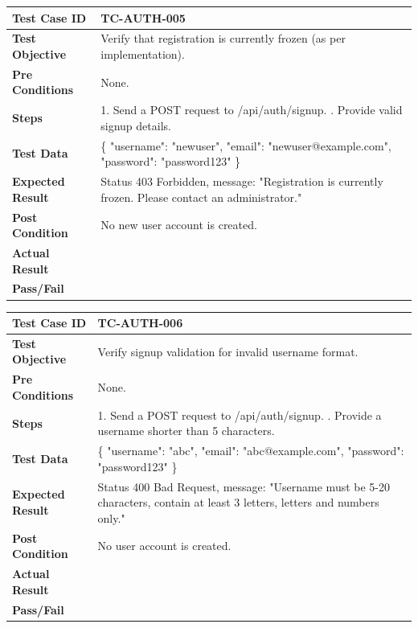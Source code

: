 \begin{longtable}{|p{}|p{}|}
\hline
\textbf{Test Case ID} & TC-AUTH-005 \\ \hline
\textbf{Test Objective} & Verify that registration is currently frozen (as per implementation). \\ \hline
\textbf{Pre Conditions} & None. \\ \hline
\textbf{Steps} & 
1. Send a POST request to /api/auth/signup. \newline
2. Provide valid signup details. \\ \hline
\textbf{Test Data} & \{ "username": "newuser", "email": "newuser@example.com", "password": "password123" \} \\ \hline
\textbf{Expected Result} & Status 403 Forbidden, message: "Registration is currently frozen. Please contact an administrator." \\ \hline
\textbf{Post Condition} & No new user account is created. \\ \hline
\textbf{Actual Result} &  \\ \hline
\textbf{Pass/Fail} &  \\ \hline
\end{longtable}

\begin{longtable}{|p{}|p{}|}
\hline
\textbf{Test Case ID} & TC-AUTH-006 \\ \hline
\textbf{Test Objective} & Verify signup validation for invalid username format. \\ \hline
\textbf{Pre Conditions} & None. \\ \hline
\textbf{Steps} & 
1. Send a POST request to /api/auth/signup. \newline
2. Provide a username shorter than 5 characters. \\ \hline
\textbf{Test Data} & \{ "username": "abc", "email": "abc@example.com", "password": "password123" \} \\ \hline
\textbf{Expected Result} & Status 400 Bad Request, message: "Username must be 5-20 characters, contain at least 3 letters, letters and numbers only." \\ \hline
\textbf{Post Condition} & No user account is created. \\ \hline
\textbf{Actual Result} &  \\ \hline
\textbf{Pass/Fail} &  \\ \hline
\end{longtable}

